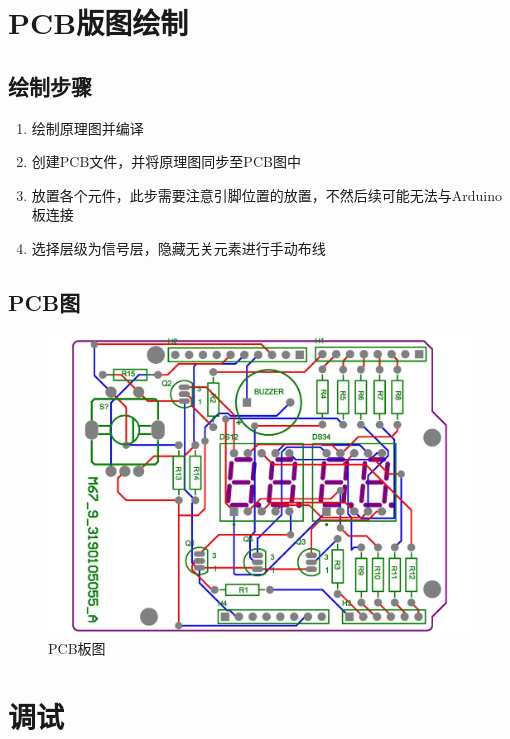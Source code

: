 \documentclass{../source/zjureport}
\begin{document}
    \section{PCB版图绘制}
        \subsection{绘制步骤}
        \begin{enumerate}
            \item 绘制原理图并编译
            \item 创建PCB文件，并将原理图同步至PCB图中
            \item 放置各个元件，此步需要注意引脚位置的放置，不然后续可能无法与Arduino板连接
            \item 选择层级为信号层，隐藏无关元素进行手动布线
        \end{enumerate}
        
        \subsection{PCB图}
            \begin{figure}[htp]
                \centering
                \includegraphics[scale = 0.55]{figures/PCB2.jpg}
                \caption{PCB板图}
            \end{figure}

    \section{调试}
\end{document}
